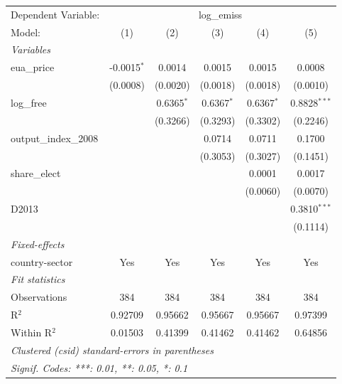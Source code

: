 
\begingroup
\centering
\begin{tabular}{lccccc}
   \tabularnewline \midrule \midrule
   Dependent Variable: & \multicolumn{5}{c}{log\_emiss}\\
   Model:                & (1)           & (2)          & (3)          & (4)          & (5)\\  
   \midrule
   \emph{Variables}\\
   eua\_price            & -0.0015$^{*}$ & 0.0014       & 0.0015       & 0.0015       & 0.0008\\   
                         & (0.0008)      & (0.0020)     & (0.0018)     & (0.0018)     & (0.0010)\\   
   log\_free             &               & 0.6365$^{*}$ & 0.6367$^{*}$ & 0.6367$^{*}$ & 0.8828$^{***}$\\   
                         &               & (0.3266)     & (0.3293)     & (0.3302)     & (0.2246)\\   
   output\_index\_2008   &               &              & 0.0714       & 0.0711       & 0.1700\\   
                         &               &              & (0.3053)     & (0.3027)     & (0.1451)\\   
   share\_elect          &               &              &              & 0.0001       & 0.0017\\   
                         &               &              &              & (0.0060)     & (0.0070)\\   
   D2013                 &               &              &              &              & 0.3810$^{***}$\\   
                         &               &              &              &              & (0.1114)\\   
   \midrule
   \emph{Fixed-effects}\\
   country-sector        & Yes           & Yes          & Yes          & Yes          & Yes\\  
   \midrule
   \emph{Fit statistics}\\
   Observations          & 384           & 384          & 384          & 384          & 384\\  
   R$^2$                 & 0.92709       & 0.95662      & 0.95667      & 0.95667      & 0.97399\\  
   Within R$^2$          & 0.01503       & 0.41399      & 0.41462      & 0.41462      & 0.64856\\  
   \midrule \midrule
   \multicolumn{6}{l}{\emph{Clustered (csid) standard-errors in parentheses}}\\
   \multicolumn{6}{l}{\emph{Signif. Codes: ***: 0.01, **: 0.05, *: 0.1}}\\
\end{tabular}
\par\endgroup


